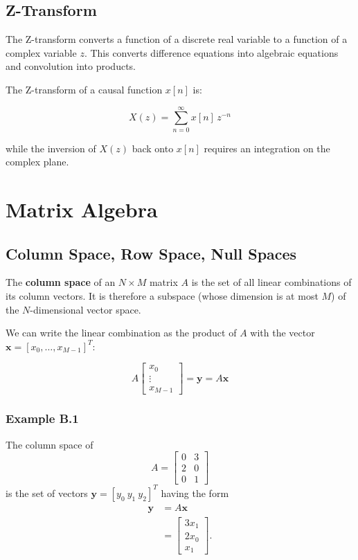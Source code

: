 \subsection*{Z-Transform}

The Z-transform converts a function of a discrete real variable to a function of a complex variable $z$.  
This converts difference equations into algebraic equations and convolution into products.

The Z-transform of a causal function $x[n]$ is:

\begin{equation}
X(z) = \sum_{n=0}^{\infty} x[n]\,z^{-n} \tag{A.13}
\end{equation}

while the inversion of $X(z)$ back onto $x[n]$ requires an integration on the complex plane.

\section*{Matrix Algebra}

\subsection*{Column Space, Row Space, Null Spaces}

The \textbf{column space} of an $N \times M$ matrix $A$ is the set of all linear combinations of its column vectors.  
It is therefore a subspace (whose dimension is at most $M$) of the $N$-dimensional vector space.

We can write the linear combination as the product of $A$ with the vector 
$\mathbf{x} = [x_0, \ldots, x_{M-1}]^T$:

\begin{equation}
A
\begin{bmatrix}
x_0 \\
\vdots \\
x_{M-1}
\end{bmatrix}
= \mathbf{y} = A\mathbf{x}
\tag{B.1}
\end{equation}

\subsubsection*{Example B.1}

The column space of
\begin{equation}
A =
\begin{bmatrix}
0 & 3 \\
2 & 0 \\
0 & 1
\end{bmatrix}
\tag{B.2}
\end{equation}
is the set of vectors $\mathbf{y} = [y_0\ y_1\ y_2]^T$ having the form
\begin{align}
\mathbf{y} &= A\mathbf{x} \tag{B.3} \\
&=
\begin{bmatrix}
3x_1 \\
2x_0 \\
x_1
\end{bmatrix}.
\tag{B.4}
\end{align}

